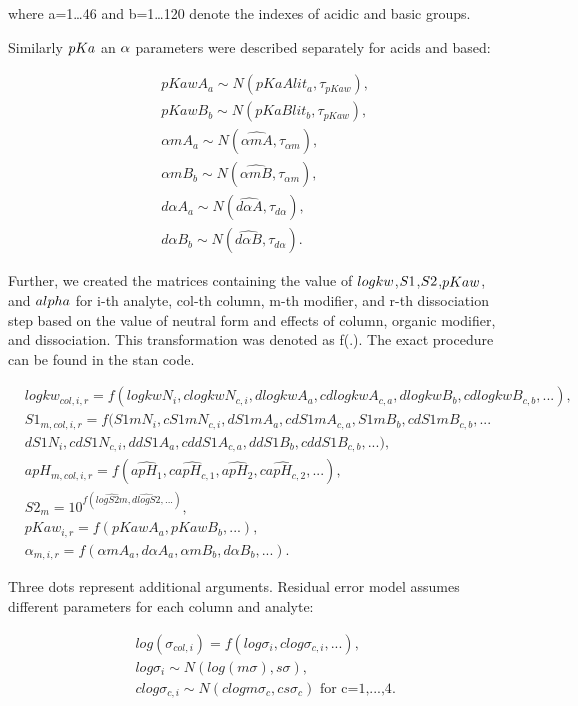 \documentclass[
]{article}
\begin{document}
where a=1\ldots46 and b=1\ldots120 denote the indexes of acidic and
basic groups.

Similarly \(\small pKa\) an \(\small \alpha\) parameters were described
separately for acids and based:

\[
\begin{aligned}
& pKawA_{a} \sim N(pKaAlit_{a}, \tau_{pKaw}), \\
& pKawB_{b} \sim N(pKaBlit_{b}, \tau_{pKaw}), \\
& \alpha mA_{a} \sim N(\widehat{\alpha m A},\tau_{\alpha m}), \\
& \alpha mB_{b} \sim N(\widehat{\alpha m B},\tau_{\alpha m}), \\
& d\alpha A_{a} \sim N(\widehat{d\alpha A},\tau_{d\alpha}), \\
& d\alpha B_{b} \sim N(\widehat{d\alpha B},\tau_{d\alpha}).
\end{aligned}
\]

Further, we created the matrices containing the value of
\(\small logkw\),\(\small S1\),\(\small S2\),\(\small pKaw\), and
\(\small alpha\) for i-th analyte, col-th column, m-th modifier, and
r-th dissociation step based on the value of neutral form and effects of
column, organic modifier, and dissociation. This transformation was
denoted as f(.). The exact procedure can be found in the stan code.

\[
\begin{aligned}
& logkw_{col,i,r}= f(logkwN_i,clogkwN_{c,i},dlogkwA_{a},cdlogkwA_{c,a}, dlogkwB_{b}, cdlogkwB_{c,b},...), \\
& S1_{m,col,i,r}  = f(S1mN_i,cS1mN_{c,i}, dS1mA_a, cdS1mA_{c,a}, S1mB_b, cdS1mB_{c,b}, ...\\
& dS1N_i, cdS1N_{c,i}, ddS1A_a, cddS1A_{c,a}, ddS1B_b, cddS1B_{c,b},...), \\
& apH_{m,col,i,r} = f(\widehat{apH_1},\widehat{capH_{c,1}},\widehat{apH_2},\widehat{capH_{c,2}},...), \\
& S2_{m} = 10^{f(\widehat{logS2m},\widehat{dlogS2},...)}, \\
& pKaw_{i,r} = f(pKawA_{a},pKawB_{b},...), \\
& \alpha_{m,i,r} = f(\alpha mA_{a}, d\alpha A_{a}, \alpha mB_{b}, d\alpha B_{b},...).
\end{aligned}
\]

Three dots represent additional arguments. Residual error model assumes
different parameters for each column and analyte:

\[
\begin{aligned}
& log(\sigma_{col,i}) = f(log\sigma_i, clog\sigma_{c,i},...), \\
& log\sigma_i  \sim N(log(m\sigma),s\sigma), \\
& clog\sigma_{c,i} \sim N(clogm\sigma_c,cs\sigma_c) \text{ for c=1,...,4}.
\end{aligned}
\]
\end{document}

